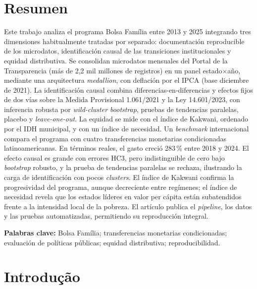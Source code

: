 \documentclass[12pt,a4paper,oneside]{article}
\begin{document}
\section*{Resumen}
\begin{singlespace}\small\noindent
Este trabajo analiza el programa Bolsa Família entre 2013 y 2025 integrando tres dimensiones habitualmente tratadas por separado: documentación reproducible de los microdatos, identificación causal de las transiciones institucionales y equidad distributiva. Se consolidan microdatos mensuales del Portal de la Transparencia (más de 2,2 mil millones de registros) en un panel estado$\times$año, mediante una arquitectura \textit{medallion}, con deflación por el IPCA (base diciembre de 2021). La identificación causal combina diferencias-en-diferencias y efectos fijos de dos vías sobre la Medida Provisional 1.061/2021 y la Ley 14.601/2023, con inferencia robusta por \textit{wild-cluster bootstrap}, pruebas de tendencias paralelas, placebo y \textit{leave-one-out}. La equidad se mide con el índice de Kakwani, ordenado por el IDH municipal, y con un índice de necesidad. Un \textit{benchmark} internacional compara el programa con cuatro transferencias monetarias condicionadas latinoamericanas. En términos reales, el gasto creció 283\,\% entre 2018 y 2024. El efecto causal es grande con errores HC3, pero indistinguible de cero bajo \textit{bootstrap} robusto, y la prueba de tendencias paralelas se rechaza, ilustrando la carga de identificación con pocos \textit{clusters}. El índice de Kakwani confirma la progresividad del programa, aunque decreciente entre regímenes; el índice de necesidad revela que los estados líderes en valor per cápita están subatendidos frente a la intensidad local de la pobreza. El artículo publica el \textit{pipeline}, los datos y las pruebas automatizadas, permitiendo su reproducción integral.

\vspace{6pt}\noindent\textbf{Palabras clave:} Bolsa Família; transferencias monetarias condicionadas; evaluación de políticas públicas; equidad distributiva; reproducibilidad.
\end{singlespace}

\clearpage

\section{Introdução}\label{sec:intro}
\end{document}
